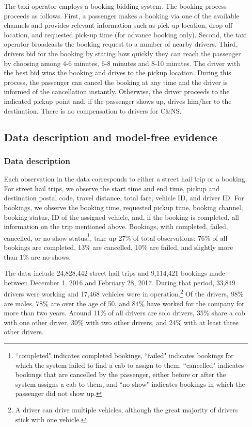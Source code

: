 \documentclass[reviewmode]{restud}
\begin{document}
The taxi operator employs a booking bidding system. The booking process proceeds as follows. First, a passenger makes a booking via one of the available channels and provides relevant information such as pick-up location, drop-off location, and requested pick-up time (for advance booking only). Second, the taxi operator broadcasts the booking request to a number of nearby drivers. Third, drivers bid for the booking by stating how quickly they can reach the passenger by choosing among 4-6 minutes, 6-8 minutes and 8-10 minutes. The driver with the best bid wins the booking and drives to the pickup location. During this process, the passenger can cancel the booking at any time and the driver is informed of the cancellation instantly. Otherwise, the driver proceeds to the indicated pickup point and, if the passenger shows up, drives him/her to the destination. There is no compensation to drivers for C\&NS.

\subsection{Data description and model-free evidence}

\subsubsection{Data description}
Each observation in the data corresponds to either a street hail trip or a booking. For street hail trips, we observe the start time and end time, pickup and destination postal code, 
travel distance, total fare, vehicle ID, and driver ID. For bookings, we observe the booking time, requested pickup time, booking channel, booking status,  ID of the assigned vehicle, and, if the booking is completed, all information on the trip mentioned above. Bookings, with completed, failed, cancelled, or no-show status\footnote{``completed" indicates completed bookings, ``failed" indicates bookings for which the system failed to find a cab to assign to them, ``cancelled" indicates bookings that are cancelled by the passenger, either before or after the system assigns a cab to them, and ``no-show" indicates bookings in which the passenger did not show up.}, take up 27\% of  total observations: 76\% of all bookings are completed, 13\% are cancelled, 10\% are failed, and slightly more than 1\% are no-shows.

The data include 24,828,442 street hail trips and 9,114,421 bookings made between December 1, 2016 and February 28, 2017. During that period, 33,849 drivers were working and 17,468 vehicles were in operation.\footnote{A 
driver can drive multiple vehicles, although the great majority of drivers stick with one vehicle.} Of the drivers, 98\% are males, 78\% are over the age of 50, and 84\% have worked for the company for more than two years. Around 11\% of all drivers are solo drivers, 35\% share a cab with one other driver, 30\% with two other drivers, and 24\% with at least three other drivers.
\end{document}
